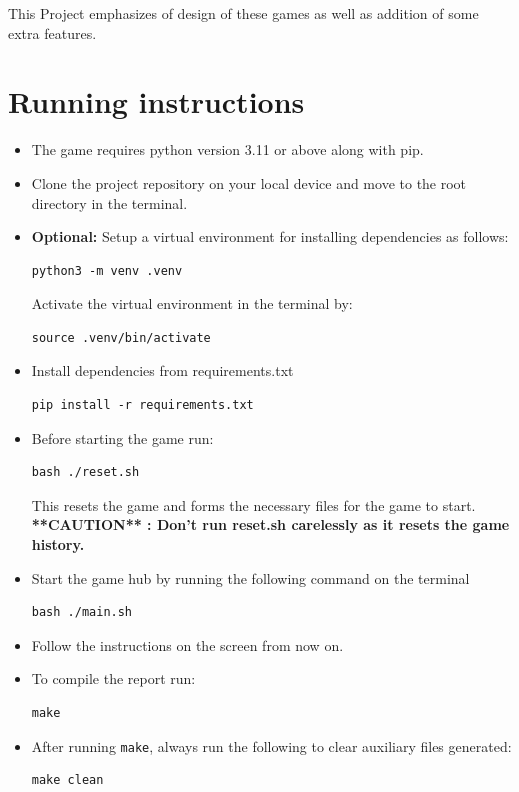 \documentclass{article}
\begin{document}
This Project emphasizes of design of these games as well as addition of some extra features.
\section{Running instructions}
\begin{itemize}
    \item The game requires python version 3.11 or above along with pip.
    \item Clone the project repository on your local device and move to the root directory in the terminal.
    \item \textbf{Optional:} Setup a virtual environment for installing dependencies as follows:
    \begin{lstlisting}[frame=single]
        python3 -m venv .venv
    \end{lstlisting}

    Activate the virtual environment in the terminal by:
    \begin{lstlisting}[frame=single]
        source .venv/bin/activate
    \end{lstlisting}

    \item Install dependencies from requirements.txt
    \begin{lstlisting}[frame=single]
        pip install -r requirements.txt
    \end{lstlisting}

    \item Before starting the game run:
    \begin{lstlisting}[frame=single]
        bash ./reset.sh
    \end{lstlisting}
    This resets the game and forms the necessary files for the game to start.
    \\
    \textbf{**CAUTION** : Don't run reset.sh carelessly as it resets the game history.}
    \item Start the game hub by running the following command on the terminal 
    \begin{lstlisting}[frame=single]
        bash ./main.sh 
    \end{lstlisting}
    \item  Follow the instructions on the screen from now on.
    \item To compile the report run:
    \begin{lstlisting}[frame=single]
        make
    \end{lstlisting}
    \item After running \texttt{make}, always run the following to clear auxiliary files generated:
    \begin{lstlisting}[frame=single]
        make clean
    \end{lstlisting}
\end{itemize}
\end{document}
